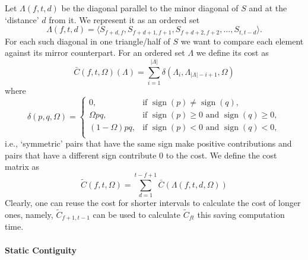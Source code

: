 \documentclass[twocolumn]{article}
\newcommand{\sign}{\mathop{\mathrm{sign}}}
\begin{document}
Let $\Lambda(f,t,d)$ be the diagonal parallel to the minor diagonal
of $S$ and at the `distance' $d$ from it. We represent it as an ordered set
\begin{dmath*}
\Lambda(f,t,d)
 = \langle S_{f+d,f}, S_{f+d+1, f+1}, S_{f+d+2, f+2},\ldots, S_{t, t-d}\rangle.
	\end{dmath*} 
For each such diagonal in one triangle/half of $S$ we want to compare
each element against its mirror counterpart. For an ordered set
$\Lambda$ we define its cost as
\begin{dmath*}
\bar C(f,t,\Omega)(\Lambda)=\sum_{i=1}^{|\Lambda|}\delta(\Lambda_i,\Lambda_{|\Lambda|-i+1},\Omega)
\end{dmath*}
where
\begin{dmath*}
\delta(p,q,\Omega) = 
\left\{\begin{array}{ll}
0,  & \text{if~}\sign( p ) \ne \sign( q ),\\
\Omega pq,   & \text{if~}  \sign(p) \ge 0 \text{~and~} \sign(q) \ge 0 ,  \\
(1-\Omega)pq,  & \text{if~} \sign(p) < 0 \text{~and~} \sign(q) < 0, \\
\end{array}\right.
\end{dmath*}
i.e., `symmetric' pairs that have the same sign make positive
contributions and pairs that have a different sign contribute $0$ to
the cost. We define the cost matrix as
\begin{dmath*}
\tilde C(f,t,\Omega) = \sum_{d=1}^{t-f+1}\bar C(\Lambda(f,t,d,\Omega))
\end{dmath*}
Clearly, one can reuse the cost for shorter intervals to calculate the
cost of longer ones, namely, $\tilde C_{f+1,t-1}$ can be used to
calculate $\tilde C_{ft}$ this saving computation time.

	
	
	\paragraph{Static Contiguity}
\end{document}
